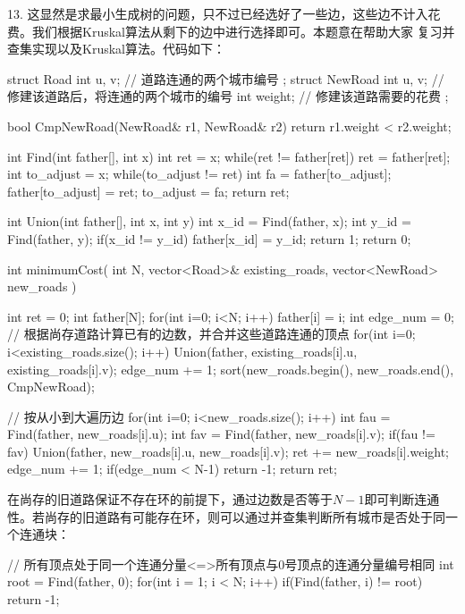 13. 这显然是求最小生成树的问题，只不过已经选好了一些边，这些边不计入花费。我们根据Kruskal算法从剩下的边中进行选择即可。本题意在帮助大家
复习并查集实现以及Kruskal算法。代码如下：
\begin{cppcode}
    struct Road {
        int u, v;   // 道路连通的两个城市编号
    };
    struct NewRoad {
        int u, v;   // 修建该道路后，将连通的两个城市的编号
        int weight; // 修建该道路需要的花费
    };

    bool CmpNewRoad(NewRoad& r1, NewRoad& r2) {
        return r1.weight < r2.weight;
    }

    int Find(int father[], int x) {
        int ret = x;
        while(ret != father[ret]) {
            ret = father[ret];
        }
        int to_adjust = x;
        while(to_adjust != ret) {
            int fa = father[to_adjust];
            father[to_adjust] = ret;
            to_adjust = fa;
        }
        return ret;
    }

    int Union(int father[], int x, int y) {
        int x_id = Find(father, x);
        int y_id = Find(father, y);
        if(x_id != y_id) {
            father[x_id] = y_id;
            return 1;
        }
        return 0;
    }

    int minimumCost(
        int N,
        vector<Road>& existing_roads,
        vector<NewRoad> new_roads
    ) {
        int ret = 0;
        int father[N];
        for(int i=0; i<N; i++) {
            father[i] = i;
        }
        int edge_num = 0;
        // 根据尚存道路计算已有的边数，并合并这些道路连通的顶点
        for(int i=0; i<existing_roads.size(); i++) {
            Union(father, existing_roads[i].u, existing_roads[i].v);
            edge_num += 1;
        }
        sort(new_roads.begin(), new_roads.end(), CmpNewRoad);

        // 按从小到大遍历边
        for(int i=0; i<new_roads.size(); i++) {
            int fau = Find(father, new_roads[i].u);
            int fav = Find(father, new_roads[i].v);
            if(fau != fav) {
                Union(father, new_roads[i].u, new_roads[i].v);
                ret += new_roads[i].weight;
                edge_num += 1;
            }
        }
        if(edge_num < N-1) {
            return -1;
        }
        return ret;

    }
\end{cppcode}
在尚存的旧道路保证不存在环的前提下，通过边数是否等于$N-1$即可判断连通性。若尚存的旧道路有可能存在环，则可以通过并查集判断所有城市是否处于同一个连通块：
\begin{cppcode}
    // 所有顶点处于同一个连通分量<=>所有顶点与0号顶点的连通分量编号相同
    int root = Find(father, 0);
    for(int i = 1; i < N; i++) {
        if(Find(father, i) != root) {
            return -1;
        }
    }
\end{cppcode}


